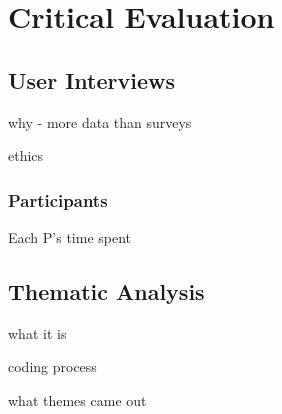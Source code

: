 \chapter{Critical Evaluation}
\label{chap:evaluation}












\section{User Interviews}
why - more data than surveys

ethics

\subsection{Participants}
Each P's time spent


\section{Thematic Analysis}
what it is

coding process

what themes came out


